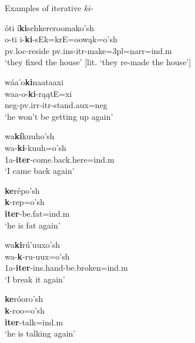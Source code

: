 \begin{exe}
\item\label{iterativeexamples} Examples of iterative \textit{ki-}

	\begin{xlist}
	
	\item \glll óti í\textbf{ki}sehkereroomako'sh\\
	o-ti i-\textbf{ki}-sEk=krE=oowąk=o'sh\\
	pv.loc-\textnormal{reside} pv.ins-itr-\textnormal{make}=3pl=narr=ind.m\\
	\glt `they fixed the house' [lit. `they re-made the house'] \citep[157]{hollow1973a}
	
	\item \glll wáa'o\textbf{ki}naataaxi\\
	waa-o-\textbf{ki}-rąątE=xi\\
	neg-pv.irr-itr-\textnormal{stand}.aux=neg\\
	\glt `he won't be getting up again' \citep[2]{hollow1973a}
	
	\item \glll wa\textbf{kí}kuuho'sh\\
	wa-\textbf{ki}-kuuh=o'sh\\
	1a-\textbf{iter}-\textnormal{come.back.here}=ind.m\\
	\glt `I came back again' \citep[450]{hollow1970}
	
	\item \glll \textbf{ke}répo'sh\\
	\textbf{k}-rep=o'sh\\
	\textbf{iter}-\textnormal{be.fat}=ind.m\\
	\glt `he is fat again' \citep[450]{hollow1970}
	
	\item \glll wa\textbf{ki}rú'uuxo'sh\\
	wa-\textbf{k}-ru-uux=o'sh\\
	1a-\textbf{iter}-ins.hand-\textnormal{be.broken}=ind.m\\
	\glt `I break it again' \citep[489]{hollow1970}
	
	\item \glll \textbf{ke}róoro'sh\\
	\textbf{k}-roo=o'sh\\
	\textbf{iter}-\textnormal{talk}=ind.m\\
	\glt `he is talking again' \citep[449]{hollow1970}
	
	
	\end{xlist}

\end{exe}

